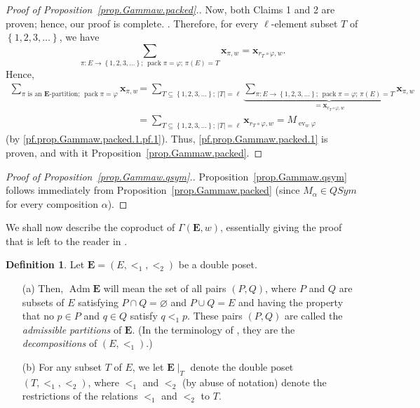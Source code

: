 \documentclass[12pt]{article}
\theoremstyle{plain}
\theoremstyle{definition}
\newtheorem{definition}[theorem]{Definition}
\theoremstyle{remark}
\let\sumnonlimits\sum
\renewcommand{\sum}{\sumnonlimits\limits}
\newcommand{\xx}{{\mathbf{x}}}
\newcommand{\ev}{\operatorname{ev}}
\newcommand{\Adm}{\operatorname{Adm}}
\newcommand{\pack}{\operatorname{pack}}
\newcommand{\EE}{{\mathbf{E}}}
\begin{document}
\begin{proof}[Proof of Proposition~\ref{prop.Gammaw.packed}.]
{Now, both Claims 1 and 2 are proven; hence, our proof is complete.
}. Therefore, for every $\ell$-element subset $T$ of
$\left\{1, 2, 3, \ldots\right\}$, we have
\[
\sum_{\pi : E \to \left\{1, 2, 3, \ldots\right\} \text{; } \pack \pi = \varphi
\text{; } \pi\left(E\right) = T}
\xx_{\pi, w}
= \xx_{r_T\circ\varphi,w} .
\]
Hence,
\begin{align*}
\sum_{\pi\text{ is an }\EE\text{-partition; } \pack \pi = \varphi}
\xx_{\pi, w}
&= \sum_{T \subseteq \left\{1, 2, 3, \ldots\right\} ; \ \left|T\right| = \ell}
\underbrace{\sum_{\pi : E \to \left\{1, 2, 3, \ldots\right\} \text{; } \pack \pi = \varphi
\text{; } \pi\left(E\right) = T}
\xx_{\pi, w}}_{= \xx_{r_T\circ\varphi,w}} \\
&= \sum_{T \subseteq \left\{1, 2, 3, \ldots\right\} ; \ \left|T\right| = \ell}
\xx_{r_T\circ\varphi,w}
= M_{\ev_w \varphi}
\end{align*}
(by \eqref{pf.prop.Gammaw.packed.1.pf.1}).
Thus, \eqref{pf.prop.Gammaw.packed.1}
is proven, and with it Proposition~\ref{prop.Gammaw.packed}.
\end{proof}

\begin{proof}[Proof of Proposition~\ref{prop.Gammaw.qsym}.]
Proposition~\ref{prop.Gammaw.qsym} follows immediately from
Proposition~\ref{prop.Gammaw.packed}
(since $M_\alpha \in QSym$ for every composition $\alpha$).
\end{proof}

We shall now describe the coproduct of $\Gamma\left(\EE, w\right)$,
essentially giving the proof that is left to the reader in
\cite[Theorem 2.2]{Mal-Reu-DP}.

\begin{definition}
Let $\EE = \left(E, <_1, <_2\right)$ be a double poset.

\begin{itemize}

\item[(a)]
Then, $\Adm \EE$ will mean the set of all pairs
$\left(P, Q\right)$, where $P$ and $Q$ are subsets of $E$ satisfying
$P \cap Q = \varnothing$ and $P \cup Q = E$ and having the property
that no $p \in P$ and $q \in Q$ satisfy $q <_1 p$. These pairs
$\left(P, Q\right)$ are
called the \textit{admissible partitions} of $\EE$. (In the
terminology of \cite{Mal-Reu-DP}, they are the
\textit{decompositions} of $\left(E, <_1\right)$.)

\item[(b)] For
any subset $T$ of $E$, we let $\EE\mid_T$ denote the double poset
$\left(T, <_1, <_2\right)$, where $<_1$ and $<_2$ (by abuse of
notation) denote the restrictions of the relations $<_1$ and $<_2$
to $T$.

\end{itemize}
\end{definition}
\end{document}
